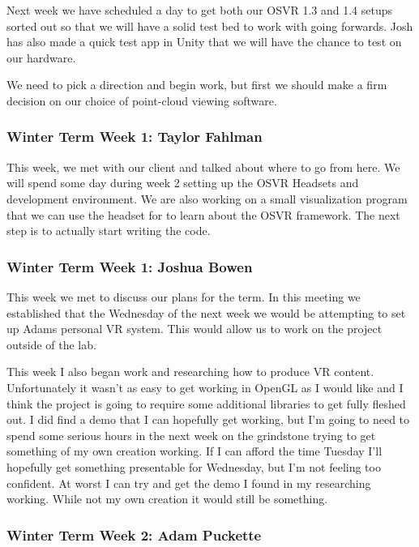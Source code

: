 \documentclass[draftclsnofoot,onecolumn]{IEEEtran}
\begin{document}
Next week we have scheduled a day to get both our OSVR 1.3 and 1.4 setups sorted out so that we will have a solid test bed to work with going forwards. Josh has also made a quick test app in Unity that we will have the chance to test on our hardware.

We need to pick a direction and begin work, but first we should make a firm decision on our choice of point-cloud viewing software.

\subsubsection{Winter Term Week 1: Taylor Fahlman}

This week, we met with our client and talked about where to go from here. We will spend some day during week 2 setting up the OSVR Headsets and development environment. We are also working on a small visualization program that we can use the headset for to learn about the OSVR framework. The next step is to actually start writing the code.

\subsubsection{Winter Term Week 1: Joshua Bowen}

This week we met to discuss our plans for the term. In this meeting we established that the Wednesday of the next week we would be attempting to set up Adams personal VR system. This would allow us to work on the project outside of the lab.

This week I also began work and researching how to produce VR content. Unfortunately it wasn't as easy to get working in OpenGL as I would like and I think the project is going to require some additional libraries to get fully fleshed out. I did find a demo that I can hopefully get working, but I'm going to need to spend some serious hours in the next week on the grindstone trying to get something of my own creation working. If I can afford the time Tuesday I'll hopefully get something presentable for Wednesday, but I'm not feeling too confident. At worst I can try and get the demo I found in my researching working. While not my own creation it would still be something.

\subsubsection{Winter Term Week 2: Adam Puckette}
\end{document}
